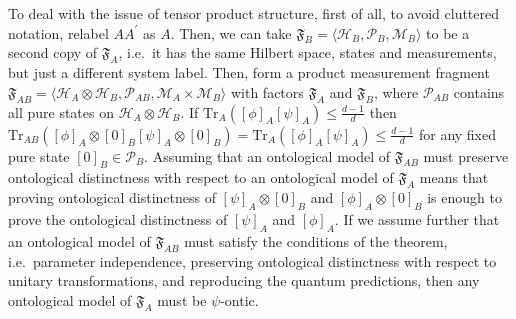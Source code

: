 \documentclass[DIV=calc,paper=a4,fontsize=11pt,twocolumn]{scrartcl} %
\theoremstyle{definition}
\theoremstyle{plain}
\newcommand{\Proj}[1]{\ensuremath{\left [ #1 \right ]}}
\newcommand{\Hilb}[1][]{\ensuremath{\mathcal{H}_{#1}}}
\newcommand{\Tr}[2][]{\ensuremath{\text{Tr}_{#1} \left ( #2 \right )}}
\begin{document}
To deal with the issue of tensor product structure, first of all, to
avoid cluttered notation, relabel $AA^{\prime}$ as $A$.  Then, we can
take $\mathfrak{F}_B = \langle \Hilb[B], \mathcal{P}_B, \mathcal{M}_B
\rangle$ to be a second copy of $\mathfrak{F}_A$, i.e.\ it has the
same Hilbert space, states and measurements, but just a different
system label.  Then, form a product measurement fragment
$\mathfrak{F}_{AB} = \langle \Hilb[A] \otimes \Hilb[B],
\mathcal{P}_{AB}, \mathcal{M}_A \times \mathcal{M}_B \rangle$ with
factors $\mathfrak{F}_A$ and $\mathfrak{F}_B$, where
$\mathcal{P}_{AB}$ contains all pure states on $\Hilb[A] \otimes
\Hilb[B]$.  If $\Tr[A]{\Proj{\phi}_A\Proj{\psi}_A} \leq \frac{d-1}{d}$
then $\Tr[AB]{\Proj{\phi}_A \otimes \Proj{0}_B\Proj{\psi}_A \otimes
\Proj{0}_B} = \Tr[A]{\Proj{\phi}_A\Proj{\psi}_A} \leq \frac{d-1}{d}$
for any fixed pure state $\Proj{0}_B \in \mathcal{P}_B$.  Assuming
that an ontological model of $\mathfrak{F}_{AB}$ must preserve
ontological distinctness with respect to an ontological model of
$\mathfrak{F}_A$ means that proving ontological distinctness of
$\Proj{\psi}_A \otimes \Proj{0}_B$ and $\Proj{\phi}_A \otimes
\Proj{0}_B$ is enough to prove the ontological distinctness of
$\Proj{\psi}_A$ and $\Proj{\phi}_A$.  If we assume further that an
ontological model of $\mathfrak{F}_{AB}$ must satisfy the conditions
of the theorem, i.e.\ parameter independence, preserving ontological
distinctness with respect to unitary transformations, and reproducing
the quantum predictions, then any ontological model of
$\mathfrak{F}_A$ must be $\psi$-ontic.
\end{document}
